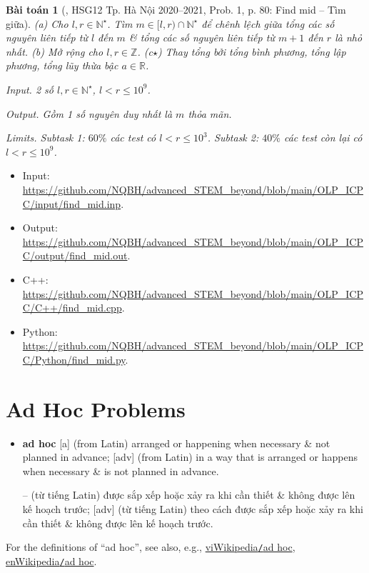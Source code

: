 \documentclass{article}
\newtheorem{baitoan}{Bài toán}
\begin{document}
\begin{baitoan}[\cite{Trung_HSG_THPT_Tin}, HSG12 Tp. Hà Nội 2020--2021, Prob. 1, p. 80: Find mid -- Tìm giữa]
	(a) Cho $l,r\in\mathbb{N}^\star$. Tìm $m\in[l,r)\cap\mathbb{N}^\star$ để chênh lệch giữa tổng các số nguyên liên tiếp từ $l$ đến $m$ \& tổng các số nguyên liên tiếp từ $m + 1$ đến $r$ là nhỏ nhất. (b) Mở rộng cho $l,r\in\mathbb{Z}$. (c$\star$) Thay tổng bởi tổng bình phương, tổng lập phương, tổng lũy thừa bậc $a\in\mathbb{R}$.
	\item {\sf Input.} 2 số $l,r\in\mathbb{N}^\star$, $l < r\le10^9$.
	\item {\sf Output.} Gồm 1 số nguyên duy nhất là $m$ thỏa mãn.
	\item {\sf Limits.} Subtask 1: $60\%$ các test có $l < r\le10^3$. Subtask 2: $40\%$ các test còn lại có $l < r\le10^9$.
\end{baitoan}

\begin{itemize}
	\item Input: \url{https://github.com/NQBH/advanced_STEM_beyond/blob/main/OLP_ICPC/input/find_mid.inp}.
	\item Output: \url{https://github.com/NQBH/advanced_STEM_beyond/blob/main/OLP_ICPC/output/find_mid.out}.
	\item C++: \url{https://github.com/NQBH/advanced_STEM_beyond/blob/main/OLP_ICPC/C++/find_mid.cpp}.
	\item Python: \url{https://github.com/NQBH/advanced_STEM_beyond/blob/main/OLP_ICPC/Python/find_mid.py}.
\end{itemize}


\section{Ad Hoc Problems}

\begin{itemize}\sf
	\item \textbf{ad hoc} [a] (from Latin) arranged or happening when necessary \& not planned in advance; [adv] (from Latin) in a way that is arranged or happens when necessary \& is not planned in advance.
	
	-- (từ tiếng Latin) được sắp xếp hoặc xảy ra khi cần thiết \& không được lên kế hoạch trước; [adv] (từ tiếng Latin) theo cách được sắp xếp hoặc xảy ra khi cần thiết \& không được lên kế hoạch trước.
\end{itemize}
For the definitions of ``ad hoc'', see also, e.g., \href{https://vi.wikipedia.org/wiki/Ad_hoc}{viWikipedia{\tt/}ad hoc}, \href{https://en.wikipedia.org/wiki/Ad_hoc}{enWikipedia{\tt/}ad hoc}.
\end{document}
